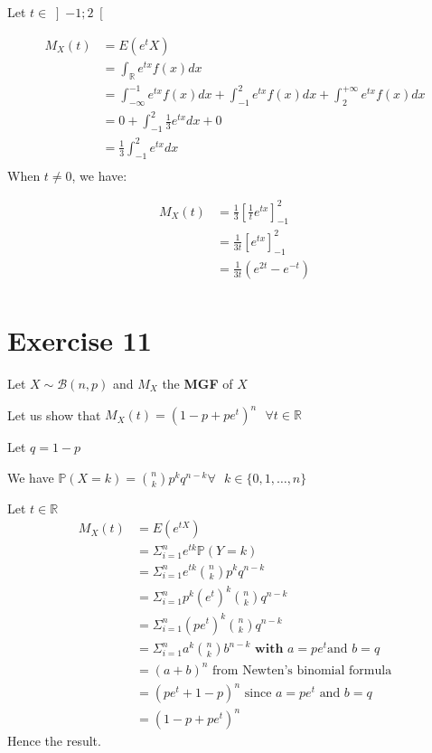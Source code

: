 \documentclass[11pt]{article}
\begin{document}
   Let $t \in \left]-1 ; 2\right[
 $
  
  \begin{align*}
M_X(t)&=E(e^tX)\\
	 &=\int_\mathbb{R} e^{tx}f(x)dx\\
	 &=\int_{-\infty}^{-1} e^{tx}f(x)dx+\int_{-1}^2 e^{tx}f(x)dx+\int_{2}^{+\infty} e^{tx}f(x)dx\\
	 &=0+\int_{-1}^2 \frac{1}{3}e^{tx}dx+0\\
	 &=\frac{1}{3}\int_{-1}^2 e^{tx}dx\\
\end{align*}
When $t \neq 0$, we have:

 
  \begin{align*}
M_X(t) &=\frac{1}{3}[\frac{1}{t}e^{tx}]_{-1}^2 \\ 
	  &=\frac{1}{3t}[e^{tx}]_{-1}^2 \\
	  &=\frac{1}{3t}(e^{2t}-e^{-t}) \\
\end{align*}
   


 
\newpage 
    \section{Exercise 11}
   Let $X  \sim \mathcal B(n,p)$ and $M_X$ the \textbf{MGF} of $X$
   
   Let us show that $M_X(t)=(1-p+pe^t)^n \text{ } \forall t \in \mathbb{R}$
   
   
   
   
Let $q=1-p$

We have $\mathbb{P}(X=k)=\binom{n}{k}p^k q^{n-k} \forall \text{ } k \in \{0, 1, \ldots, n\} $

Let $t \in \mathbb{R}$
  \begin{align*}
M_X(t) &=E(e^{tX})\\ 
	  &=\Sigma_{i=1}^{n}{ e^{tk} \mathbb{P}(Y=k)}\\   
	   &=\Sigma_{i=1}^{n}{ e^{tk} \binom{n}{k}p^k q^{n-k}}\\
	   &=\Sigma_{i=1}^{n}{ p^k (e^{t})^k \binom{n}{k}q^{n-k}}\\
	   &=\Sigma_{i=1}^{n}{(pe^{t})^k \binom{n}{k}q^{n-k}}\\
	   &=\Sigma_{i=1}^{n}{a^k \binom{n}{k}b^{n-k}} \textbf{ with } a =pe^t \text{and }  b=q\\	
	   &=(a+b)^n \text{ from Newten's binomial formula}\\
	   &=(pe^t+1-p)^n \text{ since } a =pe^t \text{ and }  b=q\\
	   &=(1-p+pe^t)^n	  	  
\end{align*}
Hence the result.
   
\end{document}
